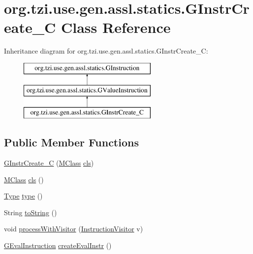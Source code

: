 \hypertarget{classorg_1_1tzi_1_1use_1_1gen_1_1assl_1_1statics_1_1_g_instr_create___c}{\section{org.\-tzi.\-use.\-gen.\-assl.\-statics.\-G\-Instr\-Create\-\_\-\-C Class Reference}
\label{classorg_1_1tzi_1_1use_1_1gen_1_1assl_1_1statics_1_1_g_instr_create___c}
}
Inheritance diagram for org.\-tzi.\-use.\-gen.\-assl.\-statics.\-G\-Instr\-Create\-\_\-\-C\-:\begin{figure}[H]
\begin{center}
\leavevmode
\includegraphics[height=3.000000cm]{classorg_1_1tzi_1_1use_1_1gen_1_1assl_1_1statics_1_1_g_instr_create___c}
\end{center}
\end{figure}
\subsection*{Public Member Functions}
\begin{DoxyCompactItemize}
\item 
\hyperlink{classorg_1_1tzi_1_1use_1_1gen_1_1assl_1_1statics_1_1_g_instr_create___c_ab1cabe1a480135ce97d34ae5758b2292}{G\-Instr\-Create\-\_\-\-C} (\hyperlink{interfaceorg_1_1tzi_1_1use_1_1uml_1_1mm_1_1_m_class}{M\-Class} \hyperlink{classorg_1_1tzi_1_1use_1_1gen_1_1assl_1_1statics_1_1_g_instr_create___c_a995c0c9c970f9e0babe787ae11abc73b}{cls})
\item 
\hyperlink{interfaceorg_1_1tzi_1_1use_1_1uml_1_1mm_1_1_m_class}{M\-Class} \hyperlink{classorg_1_1tzi_1_1use_1_1gen_1_1assl_1_1statics_1_1_g_instr_create___c_a995c0c9c970f9e0babe787ae11abc73b}{cls} ()
\item 
\hyperlink{interfaceorg_1_1tzi_1_1use_1_1uml_1_1ocl_1_1type_1_1_type}{Type} \hyperlink{classorg_1_1tzi_1_1use_1_1gen_1_1assl_1_1statics_1_1_g_instr_create___c_a4fa9acd31256ce7031e3acfa51eb21db}{type} ()
\item 
String \hyperlink{classorg_1_1tzi_1_1use_1_1gen_1_1assl_1_1statics_1_1_g_instr_create___c_a6c4afdd3d3fc51a2bc5436896dc256c9}{to\-String} ()
\item 
void \hyperlink{classorg_1_1tzi_1_1use_1_1gen_1_1assl_1_1statics_1_1_g_instr_create___c_ae938eafa2ca0c8399b7f593d8edfb377}{process\-With\-Visitor} (\hyperlink{interfaceorg_1_1tzi_1_1use_1_1gen_1_1assl_1_1statics_1_1_instruction_visitor}{Instruction\-Visitor} v)
\item 
\hyperlink{classorg_1_1tzi_1_1use_1_1gen_1_1assl_1_1dynamics_1_1_g_eval_instruction}{G\-Eval\-Instruction} \hyperlink{classorg_1_1tzi_1_1use_1_1gen_1_1assl_1_1statics_1_1_g_instr_create___c_ad5ef1e71dfc5cd317bc9ec0601bda9d0}{create\-Eval\-Instr} ()
\end{DoxyCompactItemize}


